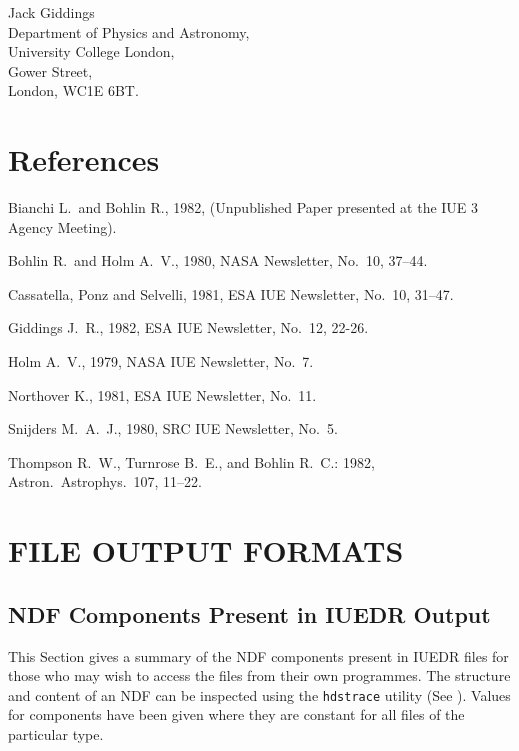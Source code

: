 Jack Giddings\\
Department of Physics and Astronomy,\\
University College London,\\
Gower Street,\\
London, WC1E 6BT.


\section{\label{se:refs}References}

Bianchi L.\ and Bohlin R., 1982, (Unpublished Paper presented at the IUE 3 Agency
Meeting)\@.

Bohlin R.\ and Holm A.~V., 1980, NASA Newsletter, No.~10, 37--44.

Cassatella, Ponz and Selvelli, 1981, ESA IUE Newsletter, No.~10, 31--47.

Giddings J.~R., 1982, ESA IUE Newsletter, No.~12, 22-26.

Holm A.~V., 1979, NASA IUE Newsletter, No.~7.

Northover K., 1981, ESA IUE Newsletter, No.~11.

Snijders M.~A.~J., 1980, SRC IUE Newsletter, No.~5.

Thompson R.~W., Turnrose B.~E., and Bohlin R.~C.: 1982, Astron.~Astrophys.~107,
11--22.

\appendix
\section{\label{ap:output}FILE OUTPUT FORMATS}


\subsection{\label{subap:ndf}NDF Components Present in
            IUEDR Output}

This Section gives a summary of the NDF components present in IUEDR files for
those who may wish to access the files from their own programmes.
The structure and content of an NDF can be inspected using the {\tt hdstrace}
utility (See
)\@.  Values for components have been given where they
are constant for all files of the particular type.


